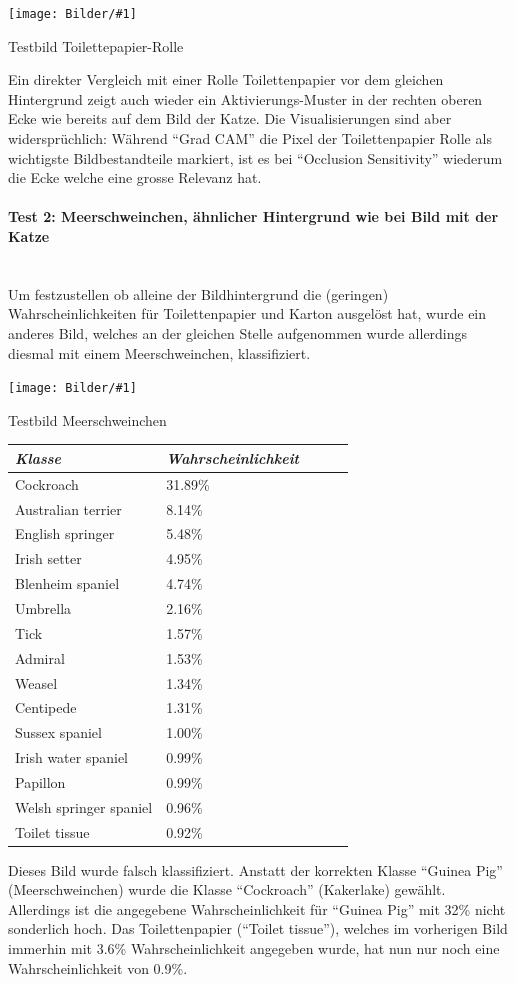 \documentclass[
  12pt, %
  a4paper, %
  oneside, %
  openany, 
  numbers=noenddot, %
  BCOR=5mm, %
  parskip=half*, %
  thesis, %
]{bfhbook}
\newcommand{\parag}[1]{\paragraph*{#1}\mbox{}\\}
\newcommand{\imgText}[3]{
\begin{center}
    \begin{minipage}[t]{0.6\textwidth}
    		\vspace{0pt}
		\texttt{[image: Bilder/\#1]}
		\caption{#2}
	\end{minipage}\hfill
    \begin{minipage}[t]{0.4\textwidth}
    		\vspace{5pt}
  		#3
    \end{minipage}
\end{center}
}
\begin{document}
\imgText{Toilett-Tissue-Classification.png}{Testbild Toilettepapier-Rolle}{
Ein direkter Vergleich mit einer Rolle Toilettenpapier vor dem gleichen Hintergrund zeigt auch wieder ein Aktivierungs-Muster in der rechten oberen Ecke wie bereits auf dem Bild der Katze. Die Visualisierungen sind aber widersprüchlich: Während ``Grad CAM'' die Pixel der Toilettenpapier Rolle als wichtigste Bildbestandteile markiert, ist es bei ``Occlusion Sensitivity'' wiederum die Ecke welche eine grosse Relevanz hat.
}

\parag{Test 2: Meerschweinchen, ähnlicher Hintergrund wie bei Bild mit der Katze}
Um festzustellen ob alleine der Bildhintergrund die (geringen) Wahrscheinlichkeiten für Toilettenpapier und Karton ausgelöst hat, wurde ein anderes Bild, welches an der gleichen Stelle aufgenommen wurde allerdings diesmal mit einem Meerschweinchen, klassifiziert.
\imgText{IMG_2729.JPG}{Testbild Meerschweinchen}{
		\begin{tabular}{@{} *5l @{}}    \toprule
		\emph{Klasse} & \emph{Wahrscheinlichkeit} &&&  \\\midrule
		Cockroach & 31.89\% \\
		Australian terrier &  8.14\% \\
		English springer & 5.48\% \\
		Irish setter & 4.95\% \\
		Blenheim spaniel & 4.74\% \\
		Umbrella & 2.16\% \\
		Tick & 1.57\% \\
		Admiral & 1.53\% \\
		Weasel  & 1.34\% \\
		Centipede & 1.31\% \\
		Sussex spaniel & 1.00\% \\
		Irish water spaniel  & 0.99\% \\
		Papillon & 0.99\% \\
		Welsh springer spaniel  & 0.96\% \\
		Toilet tissue & 0.92\% \\ \bottomrule
		 \hline
		\end{tabular}
}
\break
Dieses Bild wurde falsch klassifiziert. Anstatt der korrekten Klasse ``Guinea Pig'' (Meerschweinchen) wurde die Klasse ``Cockroach'' (Kakerlake) gewählt. Allerdings ist die angegebene Wahrscheinlichkeit für ``Guinea Pig'' mit 32\% nicht sonderlich hoch. Das Toilettenpapier (``Toilet tissue''), welches im vorherigen Bild immerhin mit 3.6\% Wahrscheinlichkeit angegeben wurde, hat nun nur noch eine Wahrscheinlichkeit von 0.9\%.
\end{document}
